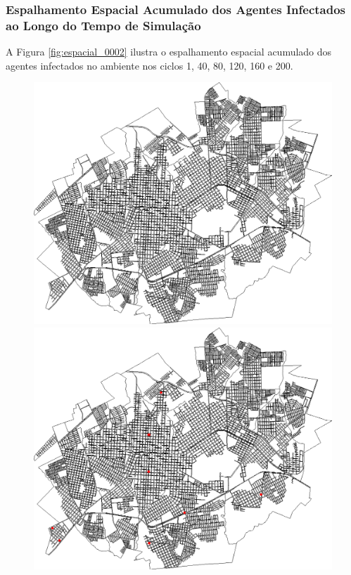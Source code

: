 \subsubsection{Espalhamento Espacial Acumulado dos Agentes Infectados ao Longo do Tempo de Simulação}

A Figura \ref{fig:espacial_0002} ilustra o espalhamento espacial acumulado dos agentes infectados no ambiente nos ciclos 1, 40, 80, 120, 160 e 200.

\begin{figure}[H]
  \centering
  \begin{minipage}{.5\textwidth}
    \centering
    \includegraphics[width=1.0\textwidth]{Figuras/Resultados/0002/Saidas_GPU_BIT/MonteCarlo_0/Simulacao_0/Espacial/00000.png}
    \captionsetup{labelformat=empty}
  \end{minipage}%
  \begin{minipage}{.5\textwidth}
    \centering
    \includegraphics[width=1.0\textwidth]{Figuras/Resultados/0002/Saidas_GPU_BIT/MonteCarlo_0/Simulacao_0/Espacial/00040.png}

\end{minipage}
\end{figure}
